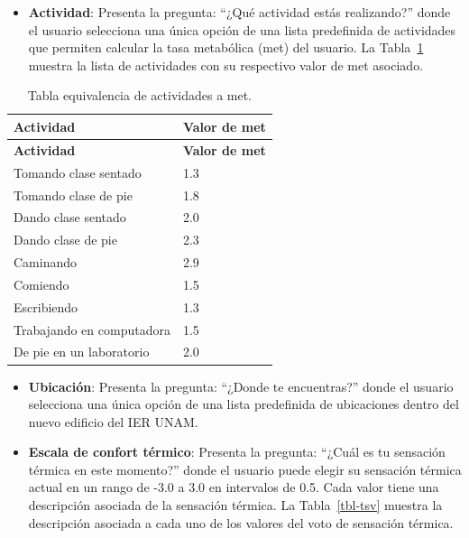 \documentclass[
  12pt,
  letterpaper,
  DIV=11,
  numbers=noendperiod]{scrreport}
\providecommand{\tightlist}{%
  \setlength{\itemsep}{0pt}\setlength{\parskip}{0pt}}\usepackage{longtable,booktabs,array}
\begin{document}
\begin{itemize}
\tightlist
\item
  \textbf{Actividad}: Presenta la pregunta: ``¿Qué actividad estás
  realizando?'' donde el usuario selecciona una única opción de una
  lista predefinida de actividades que permiten calcular la tasa
  metabólica (met) del usuario. La Tabla~\ref{tbl-actividad} muestra la
  lista de actividades con su respectivo valor de met asociado.
\end{itemize}

\hypertarget{tbl-actividad}{}
\begin{longtable}[]{@{}ll@{}}
\caption{\label{tbl-actividad}Tabla equivalencia de actividades a
met.}\tabularnewline
\toprule\noalign{}
\textbf{Actividad} & \textbf{Valor de met} \\
\midrule\noalign{}
\endfirsthead
\toprule\noalign{}
\textbf{Actividad} & \textbf{Valor de met} \\
\midrule\noalign{}
\endhead
\bottomrule\noalign{}
\endlastfoot
Tomando clase sentado & 1.3 \\
Tomando clase de pie & 1.8 \\
Dando clase sentado & 2.0 \\
Dando clase de pie & 2.3 \\
Caminando & 2.9 \\
Comiendo & 1.5 \\
Escribiendo & 1.3 \\
Trabajando en computadora & 1.5 \\
De pie en un laboratorio & 2.0 \\
\end{longtable}

\begin{itemize}
\item
  \textbf{Ubicación}: Presenta la pregunta: ``¿Donde te encuentras?''
  donde el usuario selecciona una única opción de una lista predefinida
  de ubicaciones dentro del nuevo edificio del IER UNAM.
\item
  \textbf{Escala de confort térmico}: Presenta la pregunta: ``¿Cuál es
  tu sensación térmica en este momento?'' donde el usuario puede elegir
  su sensación térmica actual en un rango de -3.0 a 3.0 en intervalos de
  0.5. Cada valor tiene una descripción asociada de la sensación
  térmica. La Tabla~\ref{tbl-tsv} muestra la descripción asociada a cada
  uno de los valores del voto de sensación térmica.
\end{itemize}
\end{document}
